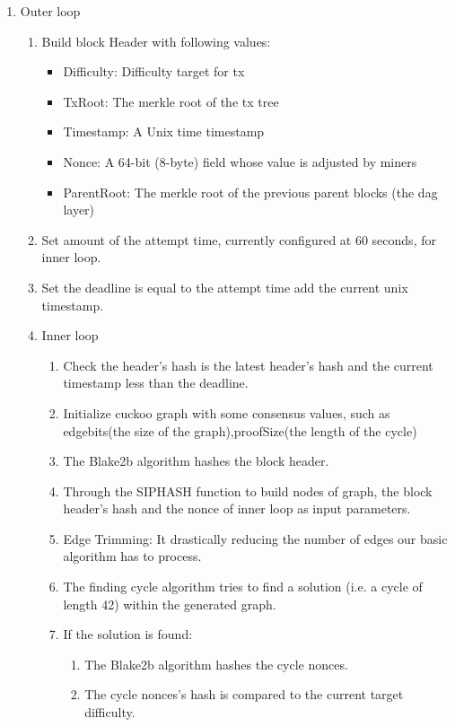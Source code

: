 \documentclass[a4paper,11pt]{article}
\begin{document}
\begin{enumerate}
	
\item Outer loop

\begin{enumerate}
	\item Build block Header with following values:
	
		\begin{itemize}
		\item Difficulty: Difficulty target for tx
		\item TxRoot: The merkle root of the tx tree
		\item Timestamp: A Unix time timestamp
		\item Nonce: A 64-bit (8-byte) field whose value is adjusted by miners
		\item ParentRoot: The merkle root of the previous parent blocks (the dag layer)
		\end{itemize}
	
	\item Set amount of the attempt time, currently configured at 60 seconds, for inner loop.
	\item Set the deadline is equal to the attempt time add the current unix timestamp.
	\item Inner loop
	
		\begin{enumerate}
			\item Check the header’s hash is the latest header’s hash and the current timestamp less than the deadline.
			\item Initialize cuckoo graph with some consensus values, such as edgebits(the size of the graph),proofSize(the length of the cycle)
			\item The Blake2b algorithm hashes the block header.
			\item Through the SIPHASH function to build nodes of graph, the block header’s hash and the nonce of inner loop as input parameters.
			\item Edge Trimming: It drastically reducing the number of edges our basic algorithm has to process.
			\item The finding cycle algorithm tries to find a solution (i.e. a cycle of length 42) within the generated graph.
			\item If the solution is found:
			
			\begin{enumerate}
				\item The Blake2b algorithm hashes the cycle nonces.
				\item The cycle nonces’s hash is compared to the current target difficulty.
			\end{enumerate}
		

\end{enumerate}
\end{enumerate}
\end{enumerate}
\end{document}
